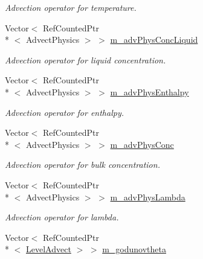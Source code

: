 \begin{DoxyCompactItemize}
\begin{DoxyCompactList}\small\item\em Advection operator for temperature. \end{DoxyCompactList}\item 
\hypertarget{classamr_mushy_layer_a5c8ae1a24964e369a013b483d078e70f}{Vector$<$ Ref\-Counted\-Ptr\\*
$<$ Advect\-Physics $>$ $>$ \hyperlink{classamr_mushy_layer_a5c8ae1a24964e369a013b483d078e70f}{m\-\_\-adv\-Phys\-Conc\-Liquid}}\label{classamr_mushy_layer_a5c8ae1a24964e369a013b483d078e70f}

\begin{DoxyCompactList}\small\item\em Advection operator for liquid concentration. \end{DoxyCompactList}\item 
\hypertarget{classamr_mushy_layer_aceebb7881eeab27ee7e79c4ca68f79b0}{Vector$<$ Ref\-Counted\-Ptr\\*
$<$ Advect\-Physics $>$ $>$ \hyperlink{classamr_mushy_layer_aceebb7881eeab27ee7e79c4ca68f79b0}{m\-\_\-adv\-Phys\-Enthalpy}}\label{classamr_mushy_layer_aceebb7881eeab27ee7e79c4ca68f79b0}

\begin{DoxyCompactList}\small\item\em Advection operator for enthalpy. \end{DoxyCompactList}\item 
\hypertarget{classamr_mushy_layer_a42f4912e166de1bb4bccbd6700289367}{Vector$<$ Ref\-Counted\-Ptr\\*
$<$ Advect\-Physics $>$ $>$ \hyperlink{classamr_mushy_layer_a42f4912e166de1bb4bccbd6700289367}{m\-\_\-adv\-Phys\-Conc}}\label{classamr_mushy_layer_a42f4912e166de1bb4bccbd6700289367}

\begin{DoxyCompactList}\small\item\em Advection operator for bulk concentration. \end{DoxyCompactList}\item 
\hypertarget{classamr_mushy_layer_ae1d0345c755e2455a7dd8c8cb40e3e6d}{Vector$<$ Ref\-Counted\-Ptr\\*
$<$ Advect\-Physics $>$ $>$ \hyperlink{classamr_mushy_layer_ae1d0345c755e2455a7dd8c8cb40e3e6d}{m\-\_\-adv\-Phys\-Lambda}}\label{classamr_mushy_layer_ae1d0345c755e2455a7dd8c8cb40e3e6d}

\begin{DoxyCompactList}\small\item\em Advection operator for lambda. \end{DoxyCompactList}\item 
\hypertarget{classamr_mushy_layer_a676a225a8c1d145f552331f59d09dd94}{Vector$<$ Ref\-Counted\-Ptr\\*
$<$ \hyperlink{class_level_advect}{Level\-Advect} $>$ $>$ \hyperlink{classamr_mushy_layer_a676a225a8c1d145f552331f59d09dd94}{m\-\_\-godunovtheta}}\label{classamr_mushy_layer_a676a225a8c1d145f552331f59d09dd94}


\end{DoxyCompactItemize}
